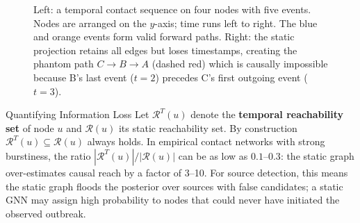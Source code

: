 \begin{figure}[H]
\caption{Left: a temporal contact sequence on four nodes with five events. Nodes are arranged
on the $y$-axis; time runs left to right. The blue and orange events form valid forward paths.
Right: the static projection retains all edges but loses timestamps, creating the phantom path
$C \to B \to A$ (dashed red) which is causally impossible because B's last event ($t=2$)
precedes C's first outgoing event ($t=3$).}
\label{fig:static_projection}
\end{figure}

\begin{keyinsight}{Quantifying Information Loss}
Let $\mathcal{R}^T(u)$ denote the \textbf{temporal reachability set} of node $u$ and
$\mathcal{R}(u)$ its static reachability set. By construction $\mathcal{R}^T(u) \subseteq
\mathcal{R}(u)$ always holds. In empirical contact networks with strong burstiness, the ratio
$|\mathcal{R}^T(u)| / |\mathcal{R}(u)|$ can be as low as $0.1$--$0.3$: the static graph
over-estimates causal reach by a factor of 3--10. For source detection, this means the static
graph floods the posterior over sources with false candidates; a static GNN may assign high
probability to nodes that could never have initiated the observed outbreak.
\end{keyinsight}

